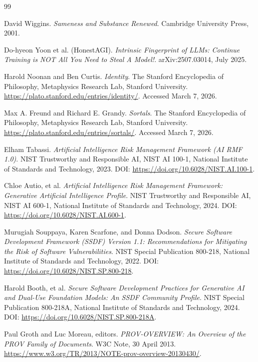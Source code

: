 \documentclass[11pt,a4paper]{article}
\begin{document}
\begin{thebibliography}{99}

David Wiggins. \textit{Sameness and Substance Renewed}. Cambridge University Press, 2001.

Do-hyeon Yoon et al. (HonestAGI). \textit{Intrinsic Fingerprint of LLMs: Continue Training is NOT All You Need to Steal A Model!}. arXiv:2507.03014, July 2025.

Harold Noonan and Ben Curtis. \textit{Identity}. The Stanford Encyclopedia of Philosophy, Metaphysics Research Lab, Stanford University. \url{https://plato.stanford.edu/entries/identity/}. Accessed March 7, 2026.

Max A. Freund and Richard E. Grandy. \textit{Sortals}. The Stanford Encyclopedia of Philosophy, Metaphysics Research Lab, Stanford University. \url{https://plato.stanford.edu/entries/sortals/}. Accessed March 7, 2026.

Elham Tabassi. \textit{Artificial Intelligence Risk Management Framework (AI RMF 1.0)}. NIST Trustworthy and Responsible AI, NIST AI 100-1, National Institute of Standards and Technology, 2023. DOI: \url{https://doi.org/10.6028/NIST.AI.100-1}.

Chloe Autio, et al. \textit{Artificial Intelligence Risk Management Framework: Generative Artificial Intelligence Profile}. NIST Trustworthy and Responsible AI, NIST AI 600-1, National Institute of Standards and Technology, 2024. DOI: \url{https://doi.org/10.6028/NIST.AI.600-1}.

Murugiah Souppaya, Karen Scarfone, and Donna Dodson. \textit{Secure Software Development Framework (SSDF) Version 1.1: Recommendations for Mitigating the Risk of Software Vulnerabilities}. NIST Special Publication 800-218, National Institute of Standards and Technology, 2022. DOI: \url{https://doi.org/10.6028/NIST.SP.800-218}.

Harold Booth, et al. \textit{Secure Software Development Practices for Generative AI and Dual-Use Foundation Models: An SSDF Community Profile}. NIST Special Publication 800-218A, National Institute of Standards and Technology, 2024. DOI: \url{https://doi.org/10.6028/NIST.SP.800-218A}.

Paul Groth and Luc Moreau, editors. \textit{PROV-OVERVIEW: An Overview of the PROV Family of Documents}. W3C Note, 30 April 2013. \url{https://www.w3.org/TR/2013/NOTE-prov-overview-20130430/}.


\end{thebibliography}
\end{document}
